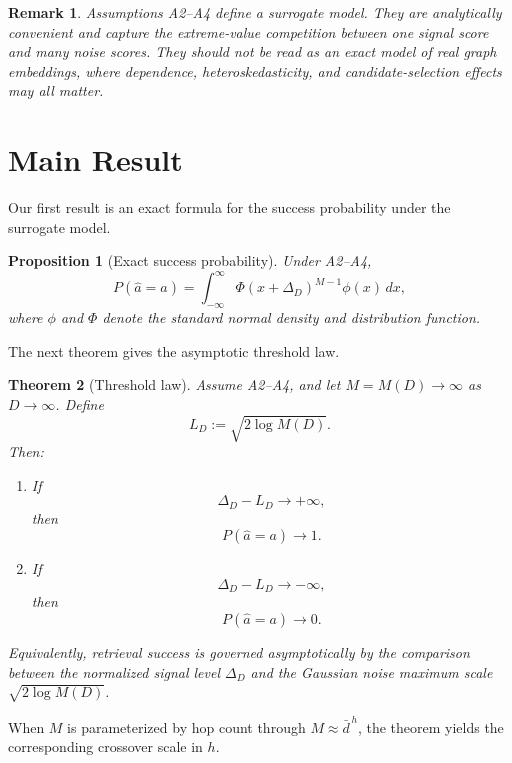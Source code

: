 \documentclass[11pt]{article}
\newtheorem{theorem}{Theorem}
\newtheorem{proposition}[theorem]{Proposition}
\newtheorem{remark}{Remark}
\begin{document}
\begin{remark}
Assumptions A2--A4 define a surrogate model. They are analytically convenient and capture the extreme-value competition between one signal score and many noise scores. They should not be read as an exact model of real graph embeddings, where dependence, heteroskedasticity, and candidate-selection effects may all matter.
\end{remark}

\section{Main Result}

Our first result is an exact formula for the success probability under the surrogate model.

\begin{proposition}[Exact success probability]\label{prop:exact}
Under A2--A4,
\begin{equation}\label{eq:exact_integral}
P(\hat a = a)
=
\int_{-\infty}^{\infty}
\Phi(x+\Delta_D)^{M-1}\phi(x)\,dx,
\end{equation}
where $\phi$ and $\Phi$ denote the standard normal density and distribution function.
\end{proposition}

The next theorem gives the asymptotic threshold law.

\begin{theorem}[Threshold law]\label{thm:threshold}
Assume A2--A4, and let $M=M(D)\to\infty$ as $D\to\infty$. Define
\[
L_D := \sqrt{2\log M(D)}.
\]
Then:
\begin{enumerate}
    \item If
    \[
    \Delta_D - L_D \to +\infty,
    \]
    then
    \[
    P(\hat a = a)\to 1.
    \]

    \item If
    \[
    \Delta_D - L_D \to -\infty,
    \]
    then
    \[
    P(\hat a = a)\to 0.
    \]
\end{enumerate}
Equivalently, retrieval success is governed asymptotically by the comparison between the normalized signal level $\Delta_D$ and the Gaussian noise maximum scale $\sqrt{2\log M(D)}$.
\end{theorem}

When $M$ is parameterized by hop count through $M \approx \bar d^{\,h}$, the theorem yields the corresponding crossover scale in $h$.
\end{document}
